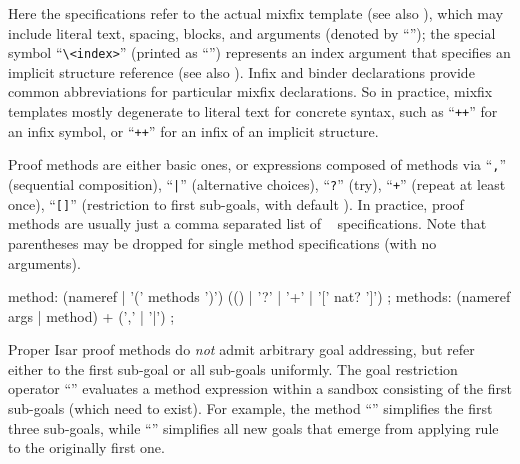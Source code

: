 \begin{isabellebody}
\begin{isamarkuptext}
  Here the  specifications refer to the actual mixfix
  template (see also \cite{isabelle-ref}), which may include literal
  text, spacing, blocks, and arguments (denoted by ``\isa{{\isacharunderscore}}''); the
  special symbol ``\verb|\<index>|'' (printed as ``\isa{{\isachardoublequote}{\isasymindex}{\isachardoublequote}}'')
  represents an index argument that specifies an implicit structure
  reference (see also ).  Infix and binder
  declarations provide common abbreviations for particular mixfix
  declarations.  So in practice, mixfix templates mostly degenerate to
  literal text for concrete syntax, such as ``\verb|++|'' for
  an infix symbol, or ``\verb|++|\isa{{\isachardoublequote}{\isasymindex}{\isachardoublequote}}'' for an infix of
  an implicit structure.%
\end{isamarkuptext}%
\isamarkuptrue%
%
\isamarkuptrue%
%
\begin{isamarkuptext}%
Proof methods are either basic ones, or expressions composed of
  methods via ``\verb|,|'' (sequential composition),
  ``\verb||\verb,|,\verb||'' (alternative choices), ``\verb|?|'' 
  (try), ``\verb|+|'' (repeat at least once), ``\verb|[|\verb|]|'' (restriction to first 
  sub-goals, with default ).  In practice, proof
  methods are usually just a comma separated list of
  ~ specifications.  Note that
  parentheses may be dropped for single method specifications (with no
  arguments).

  \begin{rail}
    method: (nameref | '(' methods ')') (() | '?' | '+' | '[' nat? ']')
    ;
    methods: (nameref args | method) + (',' | '|')
    ;
  \end{rail}

  Proper Isar proof methods do \emph{not} admit arbitrary goal
  addressing, but refer either to the first sub-goal or all sub-goals
  uniformly.  The goal restriction operator ``''
  evaluates a method expression within a sandbox consisting of the
  first  sub-goals (which need to exist).  For example, the
  method ``'' simplifies the first three
  sub-goals, while ``'' simplifies all
  new goals that emerge from applying rule  to the
  originally first one.


\end{isamarkuptext}
\end{isabellebody}
